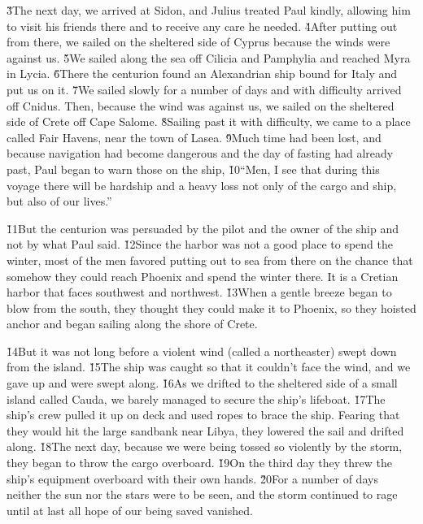 \v{3}The next day, we arrived at Sidon, and Julius treated Paul kindly, allowing him to visit his friends there and to receive any care he needed. \v{4}After putting out from there, we sailed on the sheltered side of Cyprus because the winds were against us. \v{5}We sailed along the sea off Cilicia and Pamphylia and reached Myra in Lycia. \v{6}There the centurion found an Alexandrian ship bound for Italy and put us on it. \v{7}We sailed slowly for a number of days and with difficulty arrived off Cnidus. Then, because the wind was against us, we sailed on the sheltered side of Crete off Cape Salome. \v{8}Sailing past it with difficulty, we came to a place called Fair Havens, near the town of Lasea. \v{9}Much time had been lost, and because navigation had become dangerous and the day of fasting had already past, Paul began to warn those on the ship, \v{10}``Men, I see that during this voyage there will be hardship and a heavy loss not only of the cargo and ship, but also of our lives.''

\v{11}But the centurion was persuaded by the pilot and the owner of the ship and not by what Paul said. \v{12}Since the harbor was not a good place to spend the winter, most of the men favored putting out to sea from there on the chance that somehow they could reach Phoenix and spend the winter there. It is a Cretian harbor that faces southwest and northwest. \v{13}When a gentle breeze began to blow from the south, they thought they could make it to Phoenix, so they hoisted anchor and began sailing along the shore of Crete.

\v{14}But it was not long before a violent wind (called a northeaster) swept down from the island. \v{15}The ship was caught so that it couldn't face the wind, and we gave up and were swept along. \v{16}As we drifted to the sheltered side of a small island called Cauda, we barely managed to secure the ship's lifeboat. \v{17}The ship's crew pulled it up on deck and used ropes to brace the ship. Fearing that they would hit the large sandbank near Libya, they lowered the sail and drifted along. \v{18}The next day, because we were being tossed so violently by the storm, they began to throw the cargo overboard. \v{19}On the third day they threw the ship's equipment overboard with their own hands. \v{20}For a number of days neither the sun nor the stars were to be seen, and the storm continued to rage until at last all hope of our being saved vanished.

